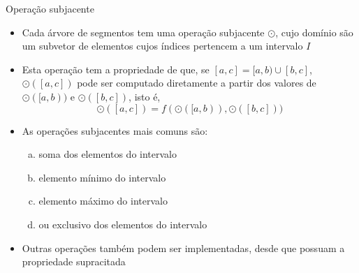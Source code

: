 \begin{frame}[fragile]{Operação subjacente}

    \begin{itemize}
        \item Cada árvore de segmentos tem uma operação subjacente $\odot$, cujo domínio são
            um subvetor de elementos cujos índices pertencem a um intervalo $I$

        \item Esta operação tem a propriedade de que, se $[a, c] = [a, b) \cup [b, c]$, 
            $\odot([a, c])$ pode ser computado diretamente a partir dos valores de 
            $\odot([a, b))$ e $\odot([b, c])$, isto é,
            \[
                \odot([a, c]) = f(\odot([a, b)), \odot([b, c]))
            \]

        \item As operações subjacentes mais comuns são:
            \begin{enumerate}[(a)]
                \item soma dos elementos do intervalo
                \item elemento mínimo do intervalo 
                \item elemento máximo do intervalo 
                \item ou exclusivo dos elementos do intervalo
            \end{enumerate}

        \item Outras operações também podem ser implementadas, desde que possuam a propriedade
            supracitada
    \end{itemize}

\end{frame}

